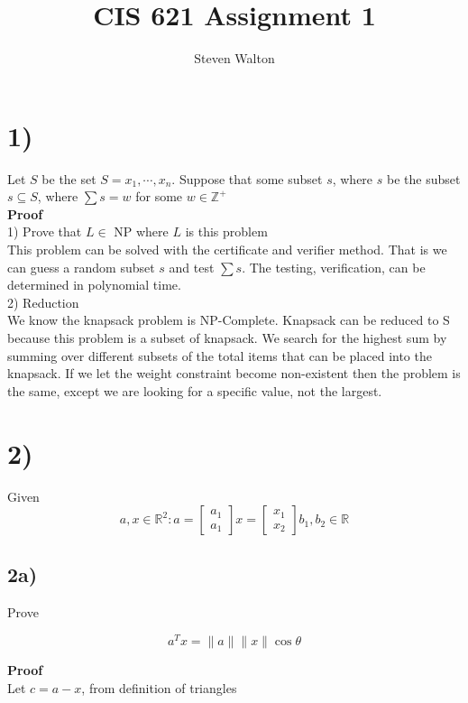\documentclass[12pt,letter]{article}
\begin{document}
\title{CIS 621 Assignment 1}
\author{Steven Walton}
\maketitle
\section*{1)}
Let $S$ be the set $S = {x_1,\cdots,x_n}$. Suppose that some subset $s$, 
where $s$ be the subset $s\subseteq S$, where $\sum s = w$ for some $w\in\mathbb{Z}^+$
\\
\textbf{Proof}\\
1) Prove that $L\in$ NP where $L$ is this problem \\
This problem can be solved with the certificate and verifier method. That is 
we can guess a random subset $s$ and test $\sum s$. The testing, verification,
can be determined in polynomial time.\\
2) Reduction\\
We know the knapsack problem is NP-Complete. Knapsack can be reduced to S 
because this problem is a subset of knapsack. We search for the
highest sum by summing over different subsets of the total items that can be placed into
the knapsack. If we let the weight constraint become non-existent then the 
problem is the same, except we are looking for a specific value, not the largest.


\section*{2)}
Given
\[
    a,x \in\mathbb{R}^2: 
    a = \begin{bmatrix}a_1 \\ a_1\end{bmatrix} 
    x = \begin{bmatrix}x_1 \\ x_2\end{bmatrix}
    b_1,b_2\in\mathbb{R}
\]

\subsection*{2a)}
Prove

\[
    a^T x = \|a\|\|x\|\cos\theta
\]

\textbf{Proof}\\
Let $c = a-x$, from definition of triangles
\end{document}
